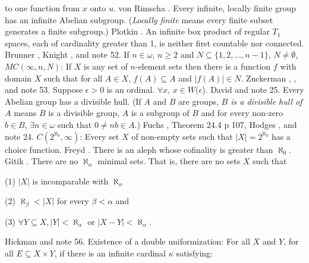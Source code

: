 to one function from $x$ onto $u$.  von \ac{Rimscha} \cite{1982}.
\medskip
{} Every infinite, locally finite group has an
infinite Abelian subgroup. ({\it Locally finite} means every finite subset
generates a finite subgroup.)  \ac{Plotkin} \cite{1981}.
\medskip
{}  An infinite box product of regular $T_1$ spaces,
each of cardinality greater than 1, is neither first countable nor
connected.  \ac{Brunner} \cite{1981a}, \ac{Knight} \cite{1964}, and
note 52.
\medskip
{} If  $n\in\omega$, $n\ge 2$ and
$N \subseteq \{ 1, 2, \ldots , n-1 \}$, $N \neq\emptyset$,
$MC(\infty,n, N)$:  If $X$ is any set of $n$-element sets then  there
is  a function $f$ with domain $X$ such that for all $A\in X$,
$f(A)\subseteq A$ and $|f(A)|\in N$. \ac{Zuckerman} \cite{1969a},
\cite{1981}, and note 53.
\medskip
{} Suppose  $\epsilon > 0$ is an ordinal.
$\forall x$, $x\in W(\epsilon$). \ac{David} \cite{1980} and note 25.
\medskip
{} Every Abelian group has a divisible
hull.  (If $A$ and $B$  are groups, {\it $B$ is a divisible hull of $A$}
means $B$ is a divisible group, $A$ is a subgroup of $B$ and for
every non-zero $b \in  B$, $\exists  n \in \omega $  such
that $0\neq nb\in A$.)  \ac{Fuchs} \cite{1970}, Theorem 24.4 p 107,
\ac{Hodges} \cite{1980}, and note 24.
\medskip
{} $C(2^{\aleph_0},\infty)$: Every set $X$ of
non-empty sets such that $|X|=2^{\aleph_0}$ has a choice function.
\ac{Freyd} \cite{1980}.
\medskip
{} There is an aleph whose cofinality is greater
than $\aleph_{0}$.  \ac{Gitik} \cite{1980}.
\medskip
{}  There are no $\aleph_{\alpha}$
minimal  sets.  That is, there are no sets $X$ such that
\item\item{}{(1)} $|X|$ is incomparable with $\aleph_{\alpha}$
\item\item{}{(2)} $\aleph_{\beta}<|X|$ for every $\beta < \alpha $ and
\item\item{}{(3)} $\forall Y\subseteq X, |Y|<\aleph_{\alpha}$ or $|X-Y|
<\aleph_{\alpha}$.
\item{} \ac{Hickman} \cite{1980b} and note 56.
\medskip
{}  Existence of a double uniformization: For all
$X$ and $Y$, for all $E\subseteq X\times Y$, if there is an infinite
cardinal $\kappa$ satisfying:
